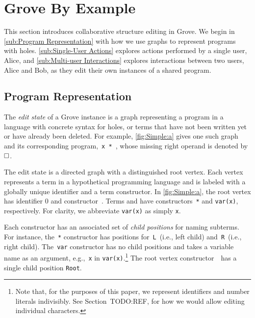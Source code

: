 
\section{Grove By Example}%
\label{sec:Grove By Example}

This section introduces collaborative structure editing in Grove.
We begin in \autoref{sub:Program Representation} with how we use graphs to represent programs with holes.
\autoref{sub:Single-User Actions} explores actions performed by a single user, Alice,
and \autoref{sub:Multi-user Interactions} explores interactions between two users, Alice and Bob,
as they edit their own instances of a shared program.

\subsection{Program Representation}%
\label{sub:Program Representation}

\figureSimple{}

The \textit{edit state} of a Grove instance is a graph representing a program
in a language with concrete syntax for holes,
or terms that have not been written yet or have already been deleted.
For example, \autoref{fig:Simple:a} gives one such graph and its corresponding program,~\texttt{x * \hole},
whose missing right operand is denoted by $\square$.

The edit state is a directed graph with a distinguished root vertex.
Each vertex represents a term in a hypothetical programming language
and is labeled with a globally unique identifier and a term constructor.     %
In \autoref{fig:Simple:a}, the root vertex has identifier 0 and constructor~\textbullet.
Terms \vSimpleTimes{} and \vSimpleX{} have constructors~\texttt{*} and \texttt{var(x)}, respectively.
For clarity, we abbreviate \texttt{var(x)} as simply \texttt{x}.

Each constructor has an associated set of \emph{child positions} for naming subterms.
For instance, the~\texttt{*} constructor has positions
for~\texttt{L}~(i.e., left child)
and~\texttt{R}~(i.e., right child).
The~\texttt{var} constructor has no child positions
and takes a variable name as an argument, e.g.,~\texttt{x} in \texttt{var(x)}.\footnote{Note that,
  for the purposes of this paper, we represent identifiers and number literals
  indivisibly.  See Section~TODO:REF, for how we would allow editing individual characters.}      %
The root vertex constructor~\textbullet~has a single child position \texttt{Root}.

